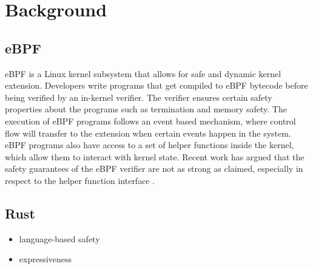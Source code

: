 \section{Background}

\subsection{eBPF}
eBPF is a Linux kernel subsystem that allows for safe and dynamic kernel extension.
Developers write programs that get compiled to eBPF bytecode before being verified by an in-kernel verifier.
The verifier ensures certain safety properties about the programs such as termination and memory safety.
The execution of eBPF programs follows an event based mechanism, where control flow will transfer to the extension when certain events happen in the system.
eBPF programs also have access to a set of helper functions inside the kernel, which allow them to interact with kernel state.
Recent work has argued that the safety guarantees of the eBPF verifier are not as strong as claimed, especially in respect to the helper function interface \cite{untenableVerification}.


\subsection{Rust}

\begin{itemize}
    \item language-based safety
    \item expressiveness
\end{itemize}

%
